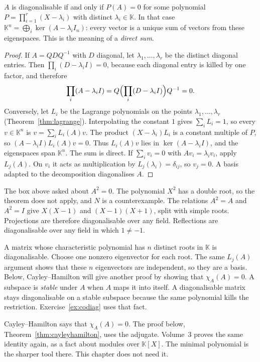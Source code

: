 \begin{theorem}[diagonalisability]\label{thm:diag}
$A$ is diagonalisable if and only if $P(A)=0$ for some polynomial $P=\prod_{i=1}^r(X-\lambda_i)$ with distinct $\lambda_i\in\mathbb K$. In that case $\mathbb K^n=\bigoplus_i\ker(A-\lambda_iI_n)$: every vector is a unique sum of vectors from these eigenspaces. This is the meaning of a \emph{direct sum}.
\end{theorem}
\begin{proof}
If $A=QDQ^{-1}$ with $D$ diagonal, let $\lambda_1,\dots,\lambda_r$ be the distinct diagonal entries. Then $\prod_i(D-\lambda_iI)=0$, because each diagonal entry is killed by one factor, and therefore
\[
\prod_i(A-\lambda_iI)=Q\Bigl(\prod_i(D-\lambda_iI)\Bigr)Q^{-1}=0.
\]
Conversely, let $L_i$ be the Lagrange polynomials on the points $\lambda_1,\dots,\lambda_r$ (Theorem~\ref{thm:lagrange}). Interpolating the constant $1$ gives $\sum_iL_i=1$, so every $v\in\mathbb K^n$ is $v=\sum_iL_i(A)v$. The product $(X-\lambda_i)L_i$ is a constant multiple of $P$, so $(A-\lambda_iI)L_i(A)v=0$. Thus $L_i(A)v$ lies in $\ker(A-\lambda_iI)$, and the eigenspaces span $\mathbb K^n$. The sum is direct. If $\sum_iv_i=0$ with $Av_i=\lambda_iv_i$, apply $L_j(A)$. On $v_i$ it acts as multiplication by $L_j(\lambda_i)=\delta_{ij}$, so $v_j=0$. A basis adapted to the decomposition diagonalises $A$.
\end{proof}

The box above asked about $A^2=0$. The polynomial $X^2$ has a double root, so the theorem does not apply, and $N$ is a counterexample. The relations $A^2=A$ and $A^2=I$ give $X(X-1)$ and $(X-1)(X+1)$, split with simple roots. Projections are therefore diagonalisable over any field. Reflections are diagonalisable over any field in which $1\ne-1$.

A matrix whose characteristic polynomial has $n$ distinct roots in $\mathbb K$ is diagonalisable. Choose one nonzero eigenvector for each root. The same $L_j(A)$ argument shows that these $n$ eigenvectors are independent, so they are a basis. Below, Cayley--Hamilton will give another proof by showing that $\chi_A(A)=0$. A subspace is \emph{stable} under $A$ when $A$ maps it into itself. A diagonalisable matrix stays diagonalisable on a stable subspace because the same polynomial kills the restriction. Exercise~\ref{ex:codiag} uses that fact.

\begin{remark}
Cayley--Hamilton says that $\chi_A(A)=0$. The proof below, Theorem~\ref{thm:cayleyhamilton}, uses the adjugate. Volume~3 proves the same identity again, as a fact about modules over $\mathbb K[X]$. The minimal polynomial is the sharper tool there. This chapter does not need it.
\end{remark}

